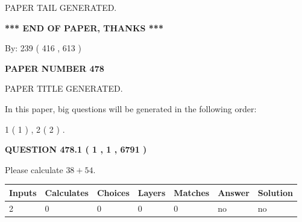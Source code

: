 \documentclass[12pt]{article}
\begin{document}
   
   
\vspace{2.0in} PAPER TAIL GENERATED.
   
   
   
   
\vspace{1.0in} 
{\textbf{\large{ *** END OF PAPER, THANKS *** }}} 
   
   
\hspace{1.0in} By: 
 239 ( 416 ,  613 )
   
   
   
   
\newpage 
\setcounter{page}{ 
   478001 } 
   
   
   
   
 {\textbf{ \Large{ PAPER NUMBER  478  }}}
   
   
\vspace{0.2in}
   
   
   
   
   
   
   
   
 \vspace{0.2in}
 
 
 
 
   
   
 PAPER TITLE GENERATED.
   
   
   
\vspace{0.2in}
   
In this paper, big questions will be generated in the following order: 
   
   
   1 ( 1 )
 ,
   2 ( 2 )
 .
  
\vspace{0.2in}
  
{\textbf{\Large{QUESTION
478.1 
 ( 1 , 1 , 6791 )
}}}
  
  
 
Please calculate $ %
38 +  %
54 $.
 
 
   
   
   
   
\noindent\begin{tabular}{|l|l|l|l|l|l|l|}
 \hline
Inputs & Calculates & Choices & Layers & Matches & Answer & Solution \\ \hline
 2  & 
 0  & 
 0
  & 
 0  & 
 0  & 
  no & 
  no 
  \\ \hline
 \end{tabular}
   
\end{document}
